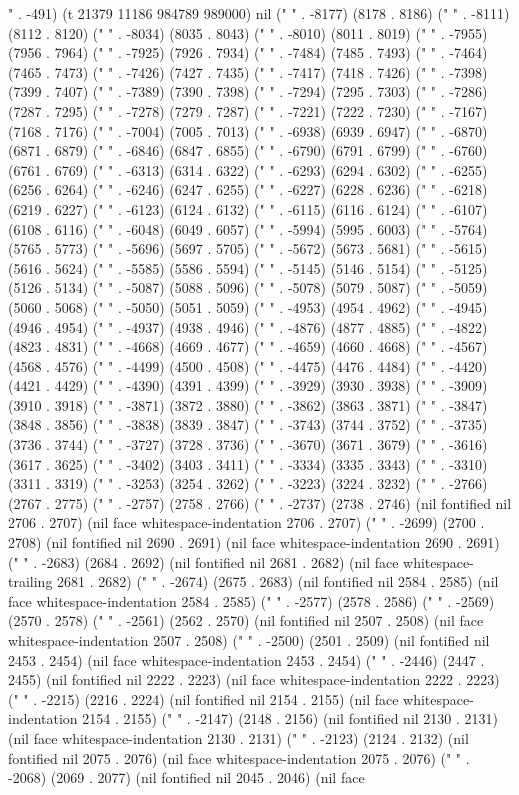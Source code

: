 {" . -491) (t 21379 11186 984789 989000) nil ("	" . -8177) (8178 . 8186) ("	" . -8111) (8112 . 8120) ("	" . -8034) (8035 . 8043) ("	" . -8010) (8011 . 8019) ("	" . -7955) (7956 . 7964) ("	" . -7925) (7926 . 7934) ("	" . -7484) (7485 . 7493) ("	" . -7464) (7465 . 7473) ("	" . -7426) (7427 . 7435) ("	" . -7417) (7418 . 7426) ("	" . -7398) (7399 . 7407) ("	" . -7389) (7390 . 7398) ("	" . -7294) (7295 . 7303) ("	" . -7286) (7287 . 7295) ("	" . -7278) (7279 . 7287) ("	" . -7221) (7222 . 7230) ("	" . -7167) (7168 . 7176) ("	" . -7004) (7005 . 7013) ("	" . -6938) (6939 . 6947) ("	" . -6870) (6871 . 6879) ("	" . -6846) (6847 . 6855) ("	" . -6790) (6791 . 6799) ("	" . -6760) (6761 . 6769) ("	" . -6313) (6314 . 6322) ("	" . -6293) (6294 . 6302) ("	" . -6255) (6256 . 6264) ("	" . -6246) (6247 . 6255) ("	" . -6227) (6228 . 6236) ("	" . -6218) (6219 . 6227) ("	" . -6123) (6124 . 6132) ("	" . -6115) (6116 . 6124) ("	" . -6107) (6108 . 6116) ("	" . -6048) (6049 . 6057) ("	" . -5994) (5995 . 6003) ("	" . -5764) (5765 . 5773) ("	" . -5696) (5697 . 5705) ("	" . -5672) (5673 . 5681) ("	" . -5615) (5616 . 5624) ("	" . -5585) (5586 . 5594) ("	" . -5145) (5146 . 5154) ("	" . -5125) (5126 . 5134) ("	" . -5087) (5088 . 5096) ("	" . -5078) (5079 . 5087) ("	" . -5059) (5060 . 5068) ("	" . -5050) (5051 . 5059) ("	" . -4953) (4954 . 4962) ("	" . -4945) (4946 . 4954) ("	" . -4937) (4938 . 4946) ("	" . -4876) (4877 . 4885) ("	" . -4822) (4823 . 4831) ("	" . -4668) (4669 . 4677) ("	" . -4659) (4660 . 4668) ("	" . -4567) (4568 . 4576) ("	" . -4499) (4500 . 4508) ("	" . -4475) (4476 . 4484) ("	" . -4420) (4421 . 4429) ("	" . -4390) (4391 . 4399) ("	" . -3929) (3930 . 3938) ("	" . -3909) (3910 . 3918) ("	" . -3871) (3872 . 3880) ("	" . -3862) (3863 . 3871) ("	" . -3847) (3848 . 3856) ("	" . -3838) (3839 . 3847) ("	" . -3743) (3744 . 3752) ("	" . -3735) (3736 . 3744) ("	" . -3727) (3728 . 3736) ("	" . -3670) (3671 . 3679) ("	" . -3616) (3617 . 3625) ("	" . -3402) (3403 . 3411) ("	" . -3334) (3335 . 3343) ("	" . -3310) (3311 . 3319) ("	" . -3253) (3254 . 3262) ("	" . -3223) (3224 . 3232) ("	" . -2766) (2767 . 2775) ("	" . -2757) (2758 . 2766) ("	" . -2737) (2738 . 2746) (nil fontified nil 2706 . 2707) (nil face whitespace-indentation 2706 . 2707) ("	" . -2699) (2700 . 2708) (nil fontified nil 2690 . 2691) (nil face whitespace-indentation 2690 . 2691) ("	" . -2683) (2684 . 2692) (nil fontified nil 2681 . 2682) (nil face whitespace-trailing 2681 . 2682) ("	" . -2674) (2675 . 2683) (nil fontified nil 2584 . 2585) (nil face whitespace-indentation 2584 . 2585) ("	" . -2577) (2578 . 2586) ("	" . -2569) (2570 . 2578) ("	" . -2561) (2562 . 2570) (nil fontified nil 2507 . 2508) (nil face whitespace-indentation 2507 . 2508) ("	" . -2500) (2501 . 2509) (nil fontified nil 2453 . 2454) (nil face whitespace-indentation 2453 . 2454) ("	" . -2446) (2447 . 2455) (nil fontified nil 2222 . 2223) (nil face whitespace-indentation 2222 . 2223) ("	" . -2215) (2216 . 2224) (nil fontified nil 2154 . 2155) (nil face whitespace-indentation 2154 . 2155) ("	" . -2147) (2148 . 2156) (nil fontified nil 2130 . 2131) (nil face whitespace-indentation 2130 . 2131) ("	" . -2123) (2124 . 2132) (nil fontified nil 2075 . 2076) (nil face whitespace-indentation 2075 . 2076) ("	" . -2068) (2069 . 2077) (nil fontified nil 2045 . 2046) (nil face }
